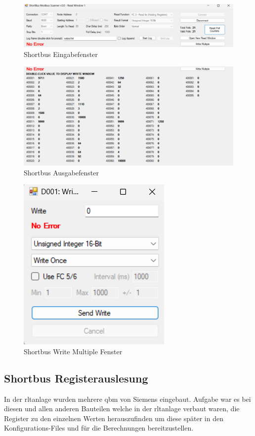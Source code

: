 \begin{figure}[H]
	\centering
	\includegraphics[width=1\linewidth]{Bilder/shortbus_eingabe}
	\caption{Shortbus Eingabefenster} 
	\label{fig:Shortbuseingabe}
\end{figure}


\begin{figure}[H]
	\centering
	\includegraphics[width=1\linewidth]{Bilder/shortbus_ausgabe}
	\caption{Shortbus Ausgabefenster} 
	\label{fig:Shortbusausgabe}
\end{figure}

\begin{figure}[H]
	\centering
	\includegraphics[width=0.3\linewidth]{Bilder/write_multiple_fenster}
	\caption{Shortbus Write Multiple Fenster} 
	\label{fig:writemultiple}
\end{figure}

\subsection{Shortbus Registerauslesung}

In der \ac{rltanlage} wurden mehrere \gls{qbm} von Siemens eingebaut. Aufgabe war es bei diesen und allen anderen Bauteilen welche in der \ac{rltanlage} verbaut waren, die Register zu den einzelnen Werten herauszufinden um diese später in den Konfigurations-Files und für die Berechnungen bereitzustellen. 

